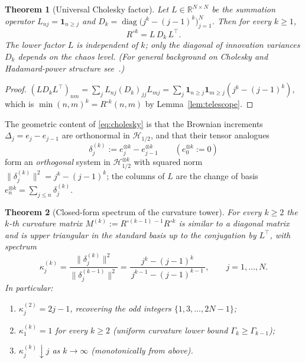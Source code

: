 \documentclass[11pt,reqno]{amsart}
\theoremstyle{plain}
\newtheorem{theorem}{Theorem}[section]
\theoremstyle{definition}
\newcommand{\R}{\mathbb{R}}
\newcommand{\HH}{\mathcal{H}}
\newcommand{\Had}{\mathbin{\circ}}     %
\DeclareMathOperator{\diag}{diag}
\newcommand{\Gam}{\Gamma}
\begin{document}
\begin{theorem}[Universal Cholesky factor]\label{thm:cholesky}
Let $L\in\R^{N\times N}$ be the summation operator $L_{nj}=\mathbf 1_{n\ge j}$
and $D_k=\diag\bigl(j^{k}-(j-1)^{k}\bigr)_{j=1}^{N}$. Then for every $k\ge1$,
\begin{equation}\label{eq:cholesky}
  R^{\Had k}=L\,D_k\,L^{\top}.
\end{equation}
The lower factor $L$ is independent of $k$; only the diagonal of innovation
variances $D_k$ depends on the chaos level. (For general background on Cholesky
and Hadamard-power structure see~\cite{HornJohnson}.)
\end{theorem}

\begin{proof}
$(L D_k L^{\top})_{nm}=\sum_j L_{nj}(D_k)_{jj}L_{mj}
=\sum_j\mathbf 1_{n\ge j}\mathbf 1_{m\ge j}(j^{k}-(j-1)^{k})$, which is
$\min(n,m)^{k}=R^{\Had k}(n,m)$ by Lemma~\ref{lem:telescope}.
\end{proof}

The geometric content of \eqref{eq:cholesky} is that the Brownian increments
$\Delta_j=e_j-e_{j-1}$ are orthonormal in $\HH_{1/2}$, and that their tensor
analogues
\begin{equation}\label{eq:incr}
  \delta_j^{(k)}:=e_j^{\otimes k}-e_{j-1}^{\otimes k}
  \qquad(e_0^{\otimes k}:=0)
\end{equation}
form an \emph{orthogonal} system in $\HH_{1/2}^{\otimes k}$ with squared norm
$\|\delta_j^{(k)}\|^{2}=j^{k}-(j-1)^{k}$; the columns of $L$ are the
change of basis $e_n^{\otimes k}=\sum_{j\le n}\delta_j^{(k)}$.

\begin{theorem}[Closed-form spectrum of the curvature tower]\label{thm:eig}
For every $k\ge2$ the $k$-th curvature matrix
$M^{(k)}:=R^{\Had(k-1)\,-1}R^{\Had k}$ is similar to a diagonal matrix and is
upper triangular in the standard basis up to the conjugation by $L^{\top}$, with
spectrum
\begin{equation}\label{eq:eig}
  \kappa_j^{(k)}=\frac{\|\delta_j^{(k)}\|^{2}}{\|\delta_j^{(k-1)}\|^{2}}
  =\frac{j^{k}-(j-1)^{k}}{\,j^{k-1}-(j-1)^{k-1}\,},\qquad j=1,\dots,N .
\end{equation}
In particular:
\begin{enumerate}[label=\textup{(\roman*)},leftmargin=2.2em]
\item $\kappa_j^{(2)}=2j-1$, recovering the odd integers $\{1,3,\dots,2N-1\}$;
\item $\kappa_1^{(k)}=1$ for every $k\ge2$ \textup(uniform curvature lower bound
$\Gam_k\ge\Gam_{k-1}$\textup);
\item $\kappa_j^{(k)}\downarrow j$ as $k\to\infty$ \textup(monotonically from above\textup).
\end{enumerate}
\end{theorem}
\end{document}
